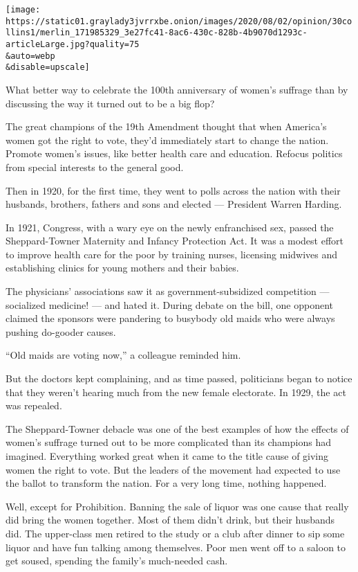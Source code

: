 \texttt{[image: https://static01.graylady3jvrrxbe.onion/images/2020/08/02/opinion/30collins1/merlin\_171985329\_3e27fc41-8ac6-430c-828b-4b9070d1293c-articleLarge.jpg?quality=75\\\&auto=webp\\\&disable=upscale]}

What better way to celebrate the 100th anniversary of women's suffrage
than by discussing the way it turned out to be a big flop?

The great champions of the 19th Amendment thought that when America's
women got the right to vote, they'd immediately start to change the
nation. Promote women's issues, like better health care and education.
Refocus politics from special interests to the general good.

Then in 1920, for the first time, they went to polls across the nation
with their husbands, brothers, fathers and sons and elected ---
President Warren Harding.

In 1921, Congress, with a wary eye on the newly enfranchised sex, passed
the Sheppard-Towner Maternity and Infancy Protection Act. It was a
modest effort to improve health care for the poor by training nurses,
licensing midwives and establishing clinics for young mothers and their
babies.

The physicians' associations saw it as government-subsidized competition
--- socialized medicine! --- and hated it. During debate on the bill,
one opponent claimed the sponsors were pandering to busybody old maids
who were always pushing do-gooder causes.

``Old maids are voting now,'' a colleague reminded him.

But the doctors kept complaining, and as time passed, politicians began
to notice that they weren't hearing much from the new female electorate.
In 1929, the act was repealed.

The Sheppard-Towner debacle was one of the best examples of how the
effects of women's suffrage turned out to be more complicated than its
champions had imagined. Everything worked great when it came to the
title cause of giving women the right to vote. But the leaders of the
movement had expected to use the ballot to transform the nation. For a
very long time, nothing happened.

Well, except for Prohibition. Banning the sale of liquor was one cause
that really did bring the women together. Most of them didn't drink, but
their husbands did. The upper-class men retired to the study or a club
after dinner to sip some liquor and have fun talking among themselves.
Poor men went off to a saloon to get soused, spending the family's
much-needed cash.


